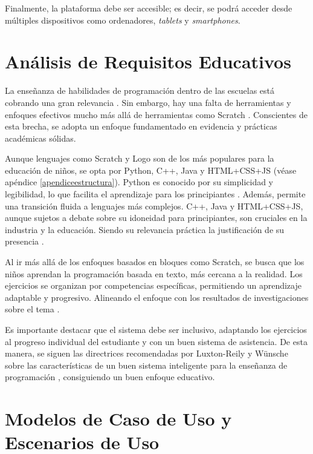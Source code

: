 Finalmente, la plataforma debe ser accesible; es decir, se podrá acceder desde múltiples dispositivos como ordenadores, \textit{tablets} y \textit{smartphones}.

\section{Análisis de Requisitos Educativos}

La enseñanza de habilidades de programación dentro de las escuelas está cobrando una gran relevancia \cite{teachingcodingchildren}. Sin embargo, hay una falta de herramientas y enfoques efectivos mucho más allá de herramientas como Scratch \cite{teachingcodingchildren}. Conscientes de esta brecha, se adopta un enfoque fundamentado en evidencia y prácticas académicas sólidas. 

Aunque lenguajes como Scratch y Logo son de los más populares para la educación de niños, se opta por Python, C++, Java y HTML+CSS+JS (véase apéndice \ref{apendiceestructura}). Python es conocido por su simplicidad y legibilidad, lo que facilita el aprendizaje para los principiantes \cite{pears2007}. Además, permite una transición fluida a lenguajes más complejos. C++, Java y HTML+CSS+JS, aunque sujetos a debate sobre su idoneidad para principiantes, son cruciales en la industria y la educación. Siendo su relevancia práctica la justificación de su presencia \cite{dewarschonberg}.

Al ir más allá de los enfoques basados en bloques como Scratch, se busca que los niños aprendan la programación basada en texto, más cercana a la realidad. Los ejercicios se organizan por competencias específicas, permitiendo un aprendizaje adaptable y progresivo. Alineando el enfoque con los resultados de investigaciones sobre el tema \cite{document2010}. 

Es importante destacar que el sistema debe ser inclusivo, adaptando los ejercicios al progreso individual del estudiante y con un buen sistema de asistencia. De esta manera, se siguen las directrices recomendadas por Luxton-Reily y Wünsche sobre las características de un buen sistema inteligente para la enseñanza de programación \cite{intelligentturoingprogrammingeducation}, consiguiendo un buen enfoque educativo.

\section{Modelos de Caso de Uso y Escenarios de Uso} \label{sec:casodeuso}

